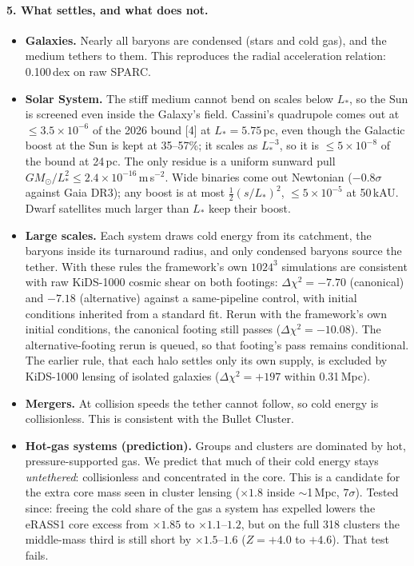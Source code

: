 \documentclass[10pt]{article}
\begin{document}
\paragraph{5. What settles, and what does not.}
\begin{itemize}
\item \textbf{Galaxies.} Nearly all baryons are condensed (stars and cold gas), and the medium tethers to them. This reproduces the radial acceleration relation: 0.100\,dex on raw SPARC.
\item \textbf{Solar System.} The stiff medium cannot bend on scales below $L_*$, so the Sun is screened even inside the Galaxy's field. Cassini's quadrupole comes out at $\le3.5\times10^{-6}$ of the 2026 bound [4] at $L_*=5.75$\,pc, even though the Galactic boost at the Sun is kept at 35--57\%; it scales as $L_*^{-3}$, so it is $\le5\times10^{-8}$ of the bound at 24\,pc. The only residue is a uniform sunward pull $GM_\odot/L_*^2\le2.4\times10^{-16}$\,m\,s$^{-2}$. Wide binaries come out Newtonian ($-0.8\sigma$ against Gaia DR3); any boost is at most $\tfrac12(s/L_*)^2$, $\le5\times10^{-5}$ at 50\,kAU. Dwarf satellites much larger than $L_*$ keep their boost.
\item \textbf{Large scales.} Each system draws cold energy from its catchment, the baryons inside its turnaround radius, and only condensed baryons source the tether. With these rules the framework's own $1024^3$ simulations are consistent with raw KiDS-1000 cosmic shear on both footings: $\Delta\chi^2=-7.70$ (canonical) and $-7.18$ (alternative) against a same-pipeline control, with initial conditions inherited from a standard fit. Rerun with the framework's own initial conditions, the canonical footing still passes ($\Delta\chi^2=-10.08$). The alternative-footing rerun is queued, so that footing's pass remains conditional. The earlier rule, that each halo settles only its own supply, is excluded by KiDS-1000 lensing of isolated galaxies ($\Delta\chi^2=+197$ within 0.31\,Mpc).
\item \textbf{Mergers.} At collision speeds the tether cannot follow, so cold energy is collisionless. This is consistent with the Bullet Cluster.
\item \textbf{Hot-gas systems (prediction).} Groups and clusters are dominated by hot, pressure-supported gas. We predict that much of their cold energy stays \emph{untethered}: collisionless and concentrated in the core. This is a candidate for the extra core mass seen in cluster lensing ($\times1.8$ inside $\sim$1\,Mpc, $7\sigma$). Tested since: freeing the cold share of the gas a system has expelled lowers the eRASS1 core excess from $\times1.85$ to $\times1.1$--$1.2$, but on the full 318 clusters the middle-mass third is still short by $\times1.5$--$1.6$ ($Z=+4.0$ to $+4.6$). That test fails.
\end{itemize}
\end{document}
